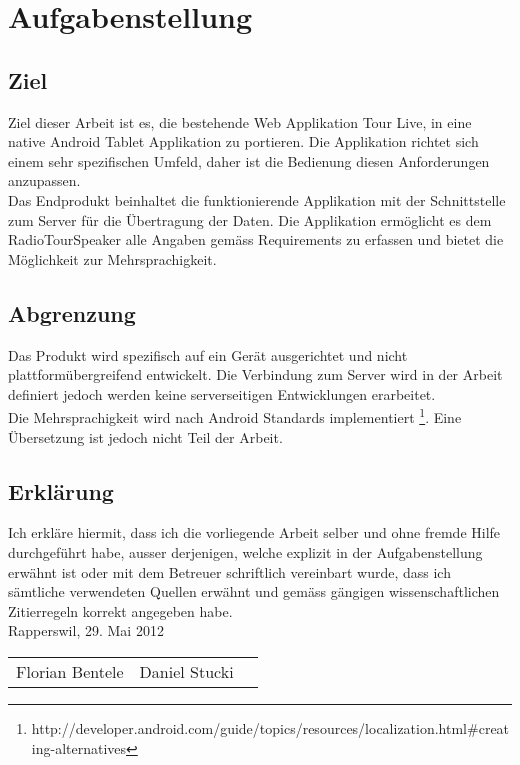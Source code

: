 \chapter*{Aufgabenstellung}

\section{Ziel}
Ziel dieser Arbeit ist es, die bestehende Web Applikation Tour Live, in eine native Android Tablet Applikation zu portieren. Die Applikation richtet sich einem sehr spezifischen Umfeld, daher ist die Bedienung diesen Anforderungen anzupassen.
\\
Das Endprodukt beinhaltet die funktionierende Applikation mit der Schnittstelle zum Server für die Übertragung der Daten. Die Applikation ermöglicht es dem RadioTour\-Speaker alle Angaben gemäss Requirements zu erfassen und bietet die Möglichkeit zur Mehrsprachigkeit.

\section{Abgrenzung}
Das Produkt wird spezifisch auf ein Gerät ausgerichtet und nicht plattformübergreifend entwickelt. Die Verbindung zum Server wird in der Arbeit definiert jedoch werden keine serverseitigen Entwicklungen erarbeitet.
\\
Die Mehrsprachigkeit wird nach Android Standards implementiert \footnote{http://developer.android.com/guide/topics/resources/localization.html\#creating-alternatives}. Eine Übersetzung ist jedoch nicht Teil der Arbeit.

\section{Erklärung}
Ich erkläre hiermit, dass ich die vorliegende Arbeit selber und ohne fremde Hilfe durchgeführt habe, ausser derjenigen, welche explizit in der Aufgabenstellung erwähnt ist oder mit dem Betreuer schriftlich vereinbart wurde, dass ich sämtliche verwendeten Quellen erwähnt und gemäss gängigen wissenschaftlichen Zitierregeln korrekt angegeben habe.
\\[1em]
Rapperswil, 29. Mai 2012
\\[1em]
\begin{tabular}{p{10cm}ll}
Florian Bentele & Daniel Stucki

\end{tabular}
